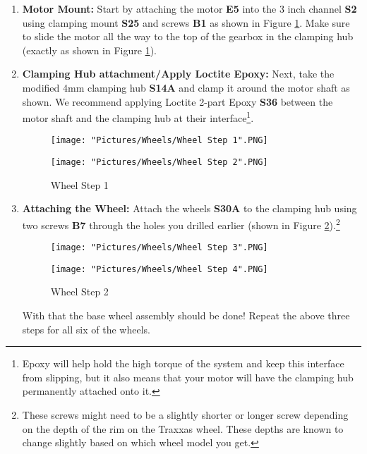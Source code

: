 \documentclass[12pt]{article}
\begin{document}
\begin{enumerate}
\item \textbf{Motor Mount:} Start by attaching the motor \textbf{E5} into the 3 inch channel \textbf{S2} using clamping mount \textbf{S25} and screws \textbf{B1} as shown in Figure \ref{wheel step 1}. Make sure to slide the motor all the way  to the top of the gearbox in the clamping hub (exactly as shown in Figure \ref{wheel step 1}).


\item \textbf{Clamping Hub attachment/Apply Loctite Epoxy:} Next, take the modified 4mm clamping hub \textbf{S14A} and clamp it around the motor shaft as shown. We recommend applying Loctite 2-part Epoxy \textbf{S36} between the motor shaft and the clamping hub at their interface\footnote{Epoxy will help hold the high torque of the system and keep this interface from slipping, but it also means that your motor will have the clamping hub permanently attached onto it.}.

\begin{figure}[H]
  \centering
  \begin{minipage}[b]{0.45\textwidth}
    \texttt{[image: "Pictures/Wheels/Wheel Step 1".PNG]}
  \end{minipage}
  \hfill
  \begin{minipage}[b]{0.45\textwidth}
    \texttt{[image: "Pictures/Wheels/Wheel Step 2".PNG]}
  \end{minipage}
  \caption{Wheel Step 1}
  \label{wheel step 1}
\end{figure}
\item \textbf{Attaching the Wheel:} Attach the wheels \textbf{S30A} to the clamping hub using two screws \textbf{B7} through the holes you drilled earlier (shown in Figure \ref{wheel step 2}).\footnote{These screws might need to be a slightly shorter or longer screw depending on the depth of the rim on the Traxxas wheel.  These depths are known to change slightly based on which wheel model you get.}

\begin{figure}[H]
  \centering
  \begin{minipage}[b]{0.45\textwidth}
    \texttt{[image: "Pictures/Wheels/Wheel Step 3".PNG]}
  \end{minipage}
  \hfill
  \begin{minipage}[b]{0.45\textwidth}
    \texttt{[image: "Pictures/Wheels/Wheel Step 4".PNG]}
  \end{minipage}
  \caption{Wheel Step 2}
  \label{wheel step 2}
\end{figure}

With that the base wheel assembly should be done! Repeat the above three steps for all six of the wheels.

\end{enumerate}
\end{document}
